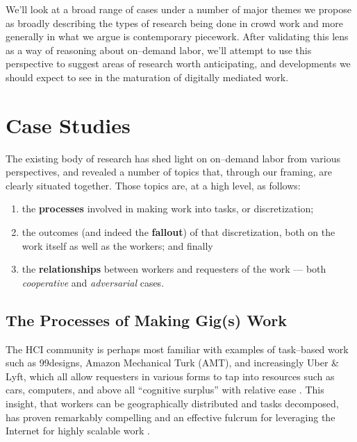 \documentclass{sigchi}
\begin{document}
We'll look at a broad range of cases under a number of major themes
we propose as broadly describing the types of research being done in crowd work
and more generally in what we argue is contemporary piecework.
After validating this lens as a way of reasoning about on--demand labor,
we'll attempt to use this perspective to suggest areas of research worth anticipating,
and developments we should expect to see in the maturation of digitally mediated work.

\section{Case Studies}
The existing body of research has shed light on on--demand labor from various perspectives,
and revealed a number of topics that,
through our framing, are clearly situated together.
Those topics are, at a high level, as follows:
\begin{enumerate}
\item the \textbf{processes} involved in making work into tasks, or discretization;
\item the outcomes (and indeed the \textbf{fallout}) of that discretization,
both on the work itself as well as the workers;
and finally
\item the \textbf{relationships} between workers and requesters of the work
--- both \textit{cooperative} and \textit{adversarial} cases.
\end{enumerate}


\subsection{The Processes of Making Gig(s) Work}\label{sec:MakingGigsWork}

The HCI community is perhaps most familiar with examples of task--based work such as
99designs,
Amazon Mechanical Turk (AMT),
and increasingly
Uber \& Lyft,
which all allow requesters in various forms to tap into
resources such as
cars,
computers, and above all
``cognitive surplus''
with relative ease
\cite{howe2006rise,DillahuntPromise,storiesIraniSilberman,shirky2010cognitive}.
This insight, that
workers can be geographically distributed and tasks decomposed,
has proven remarkably compelling
and an effective fulcrum for leveraging the Internet for highly scalable work
\cite{sensitiveTasks,embracingErrorKrishna}.
\end{document}
